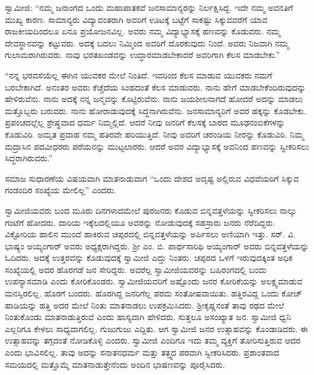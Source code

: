  ಸ್ವಾಮೀಜಿ: “ನಮ್ಮ ಜನಾಂಗದ ಒಂದು ಮಹಾಪಾತಕವೆ ಜನಸಾಮಾನ್ಯರನ್ನು ನಿರ್ಲಕ್ಷಿಸಿದ್ದ. ಇದೇ ನಮ್ಮ ಅವನತಿಗೆ ಮುಖ್ಯ ಕಾರಣ. ಸಾಮಾನ್ಯರು ವಿದ್ಯಾವಂತರಾಗಿ ಅವರಿಗೆ ಊಟಕ್ಕೆ ಬಟ್ಟೆಗೆ ಸಾಕಷ್ಟು ಸಿಕ್ಕುವವರೆಗೆ ಯಾವ ರಾಜಕೀಯದಿಂದಲೂ ಏನೂ ಪ್ರಯೋಜನವಿಲ್ಲ. ಅವರು ನಮ್ಮ ವಿದ್ಯಾಭ್ಯಾಸಕ್ಕೆ ಹಣವನ್ನು ಕೊಡುವರು. ನಮ್ಮ ದೇವಸ್ಥಾನವನ್ನು ಕಟ್ಟುವರು. ಅದಕ್ಕೆ ಬದಲು ನಿಮ್ಮಿಂದ ಅವರಿಗೆ ದೊರಕುವುದು ನಿಂದೆ. ಅವರು ನಿಜವಾಗಿ ನಮ್ಮ ಗುಲಾಮರಾಗಿರುವರು. ನಾವು ಭರತಖಂಡವನ್ನು ಉದ್ಧಾರಮಾಡಬೇಕಾದರೆ ಅವರಿಗಾಗಿ ಕೆಲಸ ಮಾಡಬೇಕು.” 

 “ನನ್ನ ಭರವಸೆಯೆಲ್ಲ ಈಗಿನ ಯುವಕರ ಮೇಲೆ ನಿಂತಿದೆ. ಇವರಿಂದ ಕೆಲಸ ಮಾಡುವ ಯುವಕರು ನಮಗೆ ಬರಬೇಕಾಗಿದೆ. ಅನಂತರ ಅವರು ಕೆಚ್ಚೆದೆಯ ಸಿಂಹದಂತೆ ಕೆಲಸ ಮಾಡುವರು. ನಾನು ಹೇಗೆ ಮಾಡಬೇಕೆಂದಿರುವುದನ್ನು ಹೇಳಿರುವೆನು. ನಾನು ಅದಕ್ಕೆ ನನ್ನ ಜನ್ಮವನ್ನು ಕೊಟ್ಟಿರುವೆನು. ನಾನು ಜಯಶೀಲನಾಗದೆ ಹೋದರೆ ಅದನ್ನು ಮಾಡಲು ಮತ್ತೊಬ್ಬರು ಬರುವರು. ನಾನು ಹೋರಾಡುವುದಕ್ಕೆ ಸಿದ್ಧನಾಗಿರುವೆನು. ಜನಸಾಮಾನ್ಯರಿಗೆ ಅವರ ಹಕ್ಕನ್ನು ಕೊಡಬೇಕು. ಪ್ರಪಂಚದಲ್ಲೆಲ್ಲ ಶ್ರೇಷ್ಥವಾದ ಧರ್ಮ ನಿಮ್ಮಲ್ಲಿದೆ. ಆದರೆ ನೀವು ಜನರಿಗೆ ಕೆಲಸಕ್ಕೆ ಬಾರದ ಮೂಢನಂಬಿಕೆಗಳನ್ನು ಕೊಡುವಿರಿ. ಅಮೃತ ಪ್ರವಾಹ ನಮ್ಮ ಹತಿರವೇ ಹರಿಯುತ್ತಿದೆ. ನೀವು ಅವರಿಗೆ ಚರಂಡಿಯ ನೀರನ್ನು ಕೊಡುವಿರಿ. ನಿಮ್ಮ ಮದ್ರಾಸಿನ ಪದವೀಧರರು ಪರೆಯನನ್ನು ಮುಟ್ಟಲಾರರು. ಆದರೆ ಅವರ ವಿದ್ಯಾಭ್ಯಾಸಕ್ಕೆ ಅವನಿಂದ ಹಣವನ್ನು ಸ್ವೀಕರಿಸಲು ಸಿದ್ಧರಾಗಿರುವರು.” 

 ಸಮಾಜ ಸುಧಾರಣೆಯ ವಿಷಯವಾಗಿ ಮಾತನಾಡುವಾಗ “ಒಂದು ದೇಶದ ಅದೃಷ್ಟ ಅಲ್ಲಿರುವ ವಿಧವೆಯರಿಗೆ ಸಿಕ್ಕುವ ಗಂಡಂದಿರ ಸಂಖ್ಯೆಯ ಮೇಲಿಲ್ಲ” ಎಂದರು. 

 ಸ್ವಾಮೀಜಿಯವರು ಬಂದ ಮೂರು ದಿನಗಳಾದಮೇಲೆ ಪುರಜನರು ಕೊಡುವ ಬಿನ್ನವತ್ತಳೆಯನ್ನು ಸ್ವೀಕರಿಸಲು ನಾಲ್ಕು ಗಂಟೆಗೆ ಹೋದರು. ದಾರಿಯ ಇಕ್ಕೆಲದಲ್ಲಿಯೂ ಅವರನ್ನು ನೋಡುವುದಕ್ಕೆ ಸಹಸ್ರಾರು ಜನರು ನೆರೆದಿದ್ದರು. ವಿಕ್ಟೋರಿಯ ಹಾಲಿನ ಮುಂದೆ ಹಾಕಿರುವ ಚಪ್ಪರದಲ್ಲಿ ಬಿನ್ನವತ್ತಳೆಯನ್ನು ಅರ್ಪಿಸಲು ಅಣಿಯಾಗಿ ಇತ್ತು. ಸರ್. ವಿ. ಭಾಷ್ಯಂ ಅಯ್ಯಂಗಾರ್ ಅವರು ಅಧ್ಯಕ್ಷರಾಗಿದ್ದರು. ಶ‍್ರೀ ಎಂ. ಬಿ. ಪಾರ್ಥಸಾರಿಥಿ ಅಯ್ಯಂಗಾರ್ ಅವರು ಬಿನ್ನವತ್ತಳೆಯನ್ನು ಓದಿದರು. ಅದಕ್ಕೆ ಉತ್ತರವನ್ನು ಕೊಡುವುದಕ್ಕೆ ಸ್ವಾಮೀಜಿ ಎದ್ದು ನಿಂತರು. ಚಪ್ಪರದ ಒಳಗೆ ಇರುವುದಕ್ಕಿಂತ ಅಧಿಕ ಸಂಖ್ಯೆಯಲ್ಲಿ ಅದರ ಹೊರಗಡೆ ಜನ ಸೇರಿದ್ದರು. ಅವರೆಲ್ಲ ಸ್ವಾಮೀಜಿಯವರನ್ನು ಬಹಿರಂಗದಲ್ಲಿ ಬಂದು ಉಪನ್ಯಾಸಮಾಡಿ ಎಂದು ಕೋರಿಕೊಂಡರು. ಸ್ವಾಮೀಜಿಯವರಿಗೆ ಅಷ್ಟೊಂದು ಜನರ ಕೋರಿಕೆಯನ್ನು ಅಲಕ್ಷ್ಯಮಾಡುವ ಮನಸ್ಸಿರಲಿಲ್ಲ. ಹೊರಗೆ ಬಂದರು. ಹೊರಗಿದ್ದ ಜನರಿಗೆಲ್ಲ ಪರಮ ಸಂತೋಷವಾಯಿತು. ಹತ್ತಿರವಿದ್ದ ಒಂದು ಕೋಚ್ ಹಾಡಿಯನ್ನು ಹತ್ತಿ ಅದರ ಮೇಲೆ ನಿಂತು ಮಾತನಾಡಲು ಉಪಕ್ರಮಿಸಿದರು. ಶ‍್ರೀಕೃಷ್ಣನಂತೆ ತಾವು ರಥದ ಮೇಲೆ ನಿಂತುಕೊಂಡು ಮಾತನಾಡುತ್ತಿರುವೆ ಎಂದು ಹಾಸ್ಯವಾಗಿ ಹೇಳಿದರು. ಸುತ್ತಲೂ ಅಸಂಖ್ಯಾತ ಜನ. ಸ್ವಾಮೀಜಿ ಧ್ವನಿ ಎಲ್ಲರಿಗೂ ಕೇಳಲು ಸಾಧ್ಯವಾಗಲಿಲ್ಲ. ಗುಜುಗುಜು ಎದ್ದಿತು. ಆಗ ಸ್ವಾಮೀಜಿ ಜನರ ಉತ್ಸಾಹವನ್ನು ಕೊಂಡಾಡಿದರು. ಈ ಉತ್ಸಾಹವನ್ನು ತಗ್ಗದಂತೆ ನೋಡಿಕೊಳ್ಳಿ ಎಂದರು. ಸ್ವಾಮೀಜಿ ಎಂದಿಗೂ ಇದು ತಮ್ಮ ವ್ಯಕ್ತಿಗೆ ತೋರಿಸುತ್ತಿರುವ ಆದರ ಎಂದು ಭಾವಿಸಲಿಲ್ಲ. ತಾವು ಅದನ್ನು ಸನಾತನಧರ್ಮ ಮತ್ತು ತತ್ತ್ವದ ಪರವಾಗಿ ಸ್ವೀಕರಿಸಿದರು. ಪ್ರಶಾಂತವಾದ ಸಮಯದಲ್ಲಿ ಮತ್ತೊಮ್ಮೆ ಮಾತನಾಡುತ್ತೇನೆಂದು ಅಂದಿನ ಭಾಷಣವನ್ನು ಪೂರೈಸಿದರು. 

